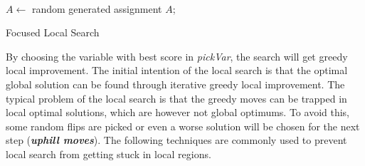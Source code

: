 \documentclass[12pt,a4paper,twoside]{scrartcl}
\numberwithin{equation}{section}
\begin{document}
\\
\begin{algorithm}[h!]
  $A \leftarrow$ random generated assignment  $A$;\;
 \caption{Focused Local Search}
\end{algorithm}  

By choosing the variable with best score in \emph{pickVar}, the search will get greedy local improvement. 
The initial intention of the local search is that the optimal global solution can be found through iterative greedy local improvement. The typical problem of the local search is that the greedy moves can be trapped in local optimal solutions, which are however not global optimums. To avoid this, some random flips are picked or even a worse solution  will be chosen for the next step (\emph{\textbf{uphill moves}}). The following techniques are commonly used to prevent local search from getting stuck in local regions.
\end{document}
